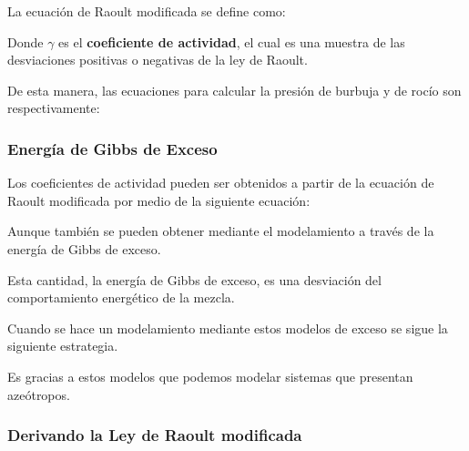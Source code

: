 
La ecuación de Raoult modificada se define como:


Donde $\gamma$ es el \textbf{coeficiente de actividad}, el cual es una muestra de las desviaciones positivas o negativas de la ley de Raoult.

De esta manera, las ecuaciones para calcular la presión de burbuja y de rocío son respectivamente:


\subsubsection{Energía de Gibbs de Exceso}

Los coeficientes de actividad pueden ser obtenidos a partir de la ecuación de Raoult modificada por medio de la siguiente ecuación:


Aunque también se pueden obtener mediante el modelamiento a través de la energía de Gibbs de exceso.


Esta cantidad, la energía de Gibbs de exceso, es una desviación del comportamiento energético de la mezcla.

Cuando se hace un modelamiento mediante estos modelos de exceso se sigue la siguiente estrategia.

Es gracias a estos modelos que podemos modelar sistemas que presentan azeótropos.

\subsubsection{Derivando la Ley de Raoult modificada}

